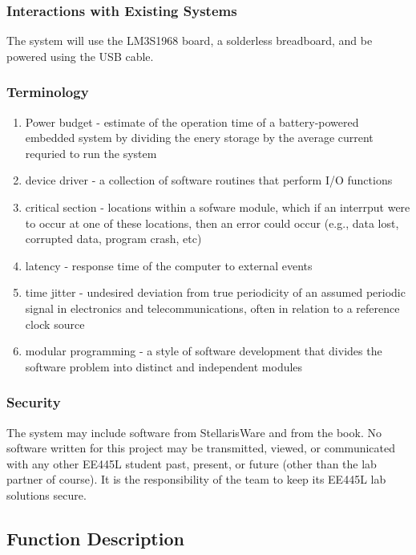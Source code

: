 \documentclass[twoside]{article}
\begin{document}
\subsubsection{Interactions with Existing Systems} 
The system will use the LM3S1968 board, a solderless
breadboard, and be powered using the USB cable.
\subsubsection{Terminology} 
\begin{enumerate}
\item Power budget - estimate of the operation time of a battery-powered embedded system by dividing the enery storage by the average current requried to run the system
\item device driver - a collection of software routines that perform I/O functions
\item critical section - locations within a sofware module, which if an interrput were to occur at one of these locations, then an error could occur (e.g., data lost, corrupted data, program crash, etc)
\item latency - response time of the computer to external events
\item time jitter - undesired deviation from true periodicity of an assumed periodic signal in electronics and telecommunications, often in relation to a reference clock source
\item modular programming - a style of software development that divides the software problem into distinct and independent modules
\end{enumerate}
\subsubsection{Security} 
The system may include software from StellarisWare and from the book. No software written for this project may be transmitted, viewed, or communicated with any other EE445L student past, present, or future (other than the lab partner of course). It is the responsibility of the team to keep its EE445L lab solutions secure.
\subsection{Function Description}
\end{document}
